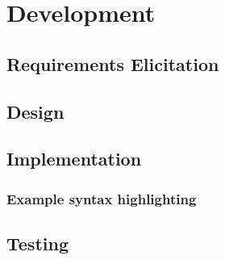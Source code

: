 \chapter{Development}


\section{Requirements Elicitation}
\section{Design}
\section{Implementation}
\subsection{Example syntax highlighting}

\captionsetup{type=figure}


\section{Testing}
